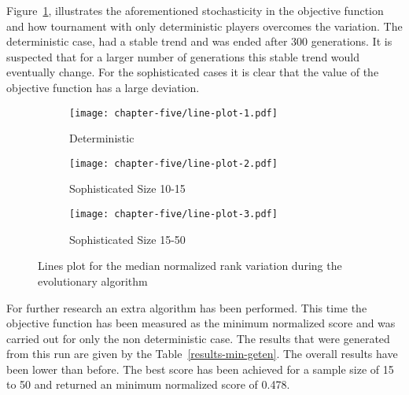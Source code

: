 Figure~\ref{fig:line-plots-median}, illustrates the aforementioned stochasticity
in the objective function and how tournament with only deterministic players
overcomes the variation. The deterministic case, had a stable trend and was
ended after 300 generations. It is suspected that for a larger number of generations
this stable trend would eventually change. For the sophisticated cases it is
clear that the value of the objective function has a large deviation.

\begin{figure}[H]
	\centering
	\begin{subfigure}[H]{0.45\textwidth}
		\centering
		\texttt{[image: chapter-five/line-plot-1.pdf]}
		\caption{Deterministic}
	\end{subfigure}
	\hfill
	\begin{subfigure}[H]{0.45\textwidth}
		\centering
		\texttt{[image: chapter-five/line-plot-2.pdf]}
		\caption{Sophisticated Size 10-15}
	\end{subfigure}
  \hfill
  \begin{subfigure}[H]{0.45\textwidth}
    \centering
    \texttt{[image: chapter-five/line-plot-3.pdf]}
    \caption{Sophisticated Size 15-50}
  \end{subfigure}
	\caption{Lines plot for the median normalized rank variation during the
          evolutionary algorithm}
	\label{fig:line-plots-median}
\end{figure}

For further research an extra algorithm has been performed. This time the
objective function has been measured as the minimum normalized score and was carried
out for only the non deterministic case. The results
that were generated from this run are given by the Table~\ref{results-min-geten}.
The overall results have been lower than before. The best score has been achieved for
a sample size of 15 to 50 and returned an minimum normalized score of 0.478.


